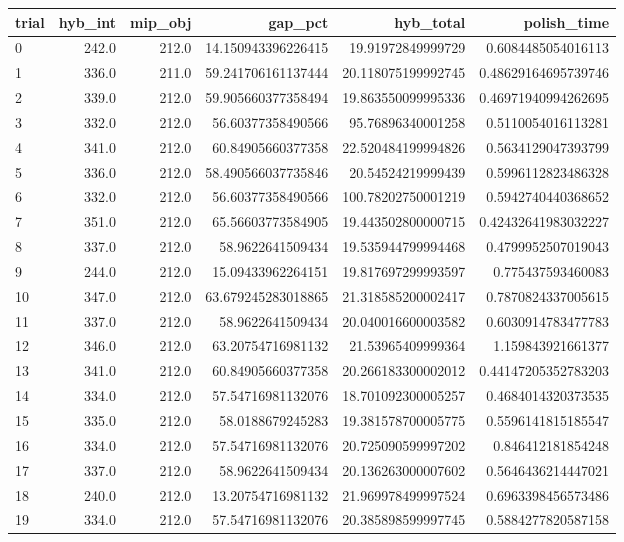 \begin{tabular}{lrrrrr}
\hline
trial & hyb_int & mip_obj & gap_pct & hyb_total & polish_time \\ \hline
0 & 242.0 & 212.0 & 14.150943396226415 & 19.91972849999729 & 0.6084485054016113 \\
1 & 336.0 & 211.0 & 59.241706161137444 & 20.118075199992745 & 0.48629164695739746 \\
2 & 339.0 & 212.0 & 59.905660377358494 & 19.863550099995336 & 0.46971940994262695 \\
3 & 332.0 & 212.0 & 56.60377358490566 & 95.76896340001258 & 0.5110054016113281 \\
4 & 341.0 & 212.0 & 60.84905660377358 & 22.520484199994826 & 0.5634129047393799 \\
5 & 336.0 & 212.0 & 58.490566037735846 & 20.54524219999439 & 0.5996112823486328 \\
6 & 332.0 & 212.0 & 56.60377358490566 & 100.78202750001219 & 0.5942740440368652 \\
7 & 351.0 & 212.0 & 65.56603773584905 & 19.443502800000715 & 0.42432641983032227 \\
8 & 337.0 & 212.0 & 58.9622641509434 & 19.535944799994468 & 0.4799952507019043 \\
9 & 244.0 & 212.0 & 15.09433962264151 & 19.817697299993597 & 0.775437593460083 \\
10 & 347.0 & 212.0 & 63.679245283018865 & 21.318585200002417 & 0.7870824337005615 \\
11 & 337.0 & 212.0 & 58.9622641509434 & 20.040016600003582 & 0.6030914783477783 \\
12 & 346.0 & 212.0 & 63.20754716981132 & 21.53965409999364 & 1.159843921661377 \\
13 & 341.0 & 212.0 & 60.84905660377358 & 20.266183300002012 & 0.44147205352783203 \\
14 & 334.0 & 212.0 & 57.54716981132076 & 18.701092300005257 & 0.4684014320373535 \\
15 & 335.0 & 212.0 & 58.0188679245283 & 19.381578700005775 & 0.5596141815185547 \\
16 & 334.0 & 212.0 & 57.54716981132076 & 20.725090599997202 & 0.846412181854248 \\
17 & 337.0 & 212.0 & 58.9622641509434 & 20.136263000007602 & 0.5646436214447021 \\
18 & 240.0 & 212.0 & 13.20754716981132 & 21.969978499997524 & 0.6963398456573486 \\
19 & 334.0 & 212.0 & 57.54716981132076 & 20.385898599997745 & 0.5884277820587158 \\
\hline
\end{tabular}
